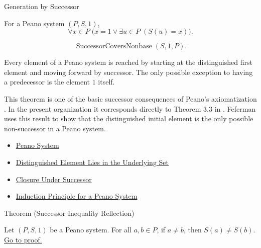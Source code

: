 \begin{topicbox}{Generation by Successor}
\begin{remark*}
For a Peano system $(P,S,1)$,
\[
\forall x \in P\;\bigl(x=1 \lor \exists u \in P\;(S(u)=x)\bigr).
\]
\end{remark*}

\begin{remark*}
\[
\operatorname{SuccessorCoversNonbase}(S,1,P).
\]
\end{remark*}

\begin{remark*}[Interpretation]
Every element of a Peano system is reached by starting at the distinguished
first element and moving forward by successor. The only possible exception to
having a predecessor is the element $1$ itself.
\end{remark*}

\begin{remark*}
This theorem is one of the basic successor consequences of Peano's
axiomatization \citep{PeanoArithmeticesPrincipia1889}. In the present
organization it corresponds directly to Theorem 3.3 in
\citet{FefermanNumberSystems1964}. Feferman uses this result to show that
the distinguished initial element is the only possible non-successor in a
Peano system.
\end{remark*}

\begin{dependencies}
\begin{itemize}
  \item \hyperref[def:peano-system]{Peano System}
  \item \hyperref[ax:peano-base-in-set]{Distinguished Element Lies in the Underlying Set}
  \item \hyperref[ax:peano-successor-closure]{Closure Under Successor}
  \item \hyperref[thm:induction-principle-for-peano-system]{Induction Principle for a Peano System}
\end{itemize}
\end{dependencies}

\begin{theorembox}{Theorem (Successor Inequality Reflection)}
\begin{theorem}
\label{thm:successor-inequality-reflection}
Let $(P,S,1)$ be a Peano system. For all $a,b \in P$, if $a \neq b$, then
$S(a)\neq S(b)$.
\hyperref[prf:successor-inequality-reflection]{Go to proof.}
\end{theorem}
\end{theorembox}


\end{topicbox}
